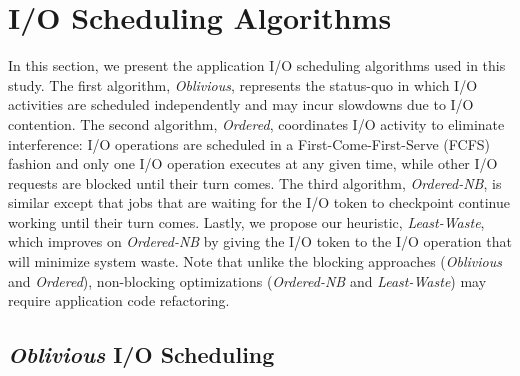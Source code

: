\documentclass[two]{article}
\newcommand{\dca}[1]{\todo[inline]{DCA: #1}}
\newcommand{\nocoop}{\emph{Oblivious}\xspace}
\newcommand{\fifoblock}{\emph{Ordered}\xspace}
\newcommand{\fifononblock}{\emph{Ordered-NB}\xspace}
\newcommand{\leastwaste}{\emph{Least-Waste}\xspace}
\def\cooperative{\leastwaste}
\begin{document}
%

\section{I/O Scheduling Algorithms}
\label{sec:algorithms}

In this section, we present the application I/O scheduling algorithms used in
this study.  The first algorithm, \nocoop, represents the status-quo in which
I/O activities are scheduled independently and may incur slowdowns due to I/O
contention. The second algorithm, \fifoblock, coordinates I/O activity to
eliminate interference: I/O operations are scheduled in a
First-Come-First-Serve (FCFS) fashion and only one I/O operation executes at
any given time, while other I/O requests are blocked until their turn comes.
The third algorithm, \fifononblock, is similar except that jobs that are
waiting for the I/O token to checkpoint continue working until their turn
comes.  Lastly, we propose our heuristic, \leastwaste,  which improves on
\fifononblock by giving the I/O token to the I/O operation that will minimize
system waste. Note that unlike the blocking approaches (\nocoop and
\fifoblock), non-blocking optimizations (\fifononblock and \cooperative) may
require application code refactoring.



\subsection{\nocoop I/O Scheduling}
\end{document}
